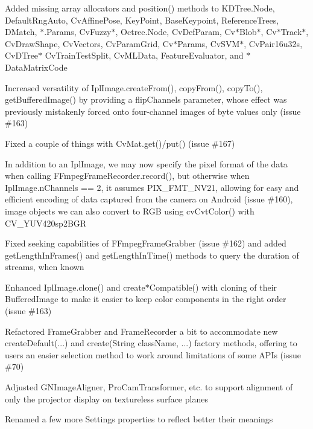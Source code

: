 \begin{DoxyItemize}
\item Added missing array allocators and {\ttfamily position()} methods to {\ttfamily K\+D\+Tree.\+Node}, {\ttfamily Default\+Rng\+Auto}, {\ttfamily Cv\+Affine\+Pose}, {\ttfamily Key\+Point}, {\ttfamily Base\+Keypoint}, {\ttfamily Reference\+Trees}, {\ttfamily D\+Match}, {\ttfamily $\ast$.Params}, {\ttfamily Cv\+Fuzzy$\ast$}, {\ttfamily Octree.\+Node}, {\ttfamily Cv\+Def\+Param}, {\ttfamily Cv$\ast$\+Blob$\ast$}, {\ttfamily Cv$\ast$\+Track$\ast$}, {\ttfamily Cv\+Draw\+Shape}, {\ttfamily Cv\+Vectors}, {\ttfamily Cv\+Param\+Grid}, {\ttfamily Cv$\ast$\+Params}, {\ttfamily Cv\+S\+V\+M$\ast$}, {\ttfamily Cv\+Pair16u32s}, {\ttfamily Cv\+D\+Tree$\ast$} {\ttfamily Cv\+Train\+Test\+Split}, {\ttfamily Cv\+M\+L\+Data}, {\ttfamily Feature\+Evaluator}, and {\ttfamily $\ast$\+Data\+Matrix\+Code}
\item Increased versatility of {\ttfamily Ipl\+Image.\+create\+From()}, {\ttfamily copy\+From()}, {\ttfamily copy\+To()}, {\ttfamily get\+Buffered\+Image()} by providing a {\ttfamily flip\+Channels} parameter, whose effect was previously mistakenly forced onto four-\/channel images of byte values only (issue \#163)
\item Fixed a couple of things with {\ttfamily Cv\+Mat.\+get()/put()} (issue \#167)
\item In addition to an {\ttfamily Ipl\+Image}, we may now specify the pixel format of the data when calling {\ttfamily F\+Fmpeg\+Frame\+Recorder.\+record()}, but otherwise when {\ttfamily Ipl\+Image.\+n\+Channels == 2}, it assumes {\ttfamily P\+I\+X\+\_\+\+F\+M\+T\+\_\+\+N\+V21}, allowing for easy and efficient encoding of data captured from the camera on Android (issue \#160), image objects we can also convert to R\+G\+B using {\ttfamily cv\+Cvt\+Color()} with {\ttfamily C\+V\+\_\+\+Y\+U\+V420sp2\+B\+G\+R}
\item Fixed seeking capabilities of {\ttfamily F\+Fmpeg\+Frame\+Grabber} (issue \#162) and added {\ttfamily get\+Length\+In\+Frames()} and {\ttfamily get\+Length\+In\+Time()} methods to query the duration of streams, when known
\item Enhanced {\ttfamily Ipl\+Image.\+clone()} and {\ttfamily create$\ast$\+Compatible()} with cloning of their {\ttfamily Buffered\+Image} to make it easier to keep color components in the right order (issue \#163)
\item Refactored {\ttfamily Frame\+Grabber} and {\ttfamily Frame\+Recorder} a bit to accommodate new {\ttfamily create\+Default(...)} and {\ttfamily create(String class\+Name, ...)} factory methods, offering to users an easier selection method to work around limitations of some A\+P\+Is (issue \#70)
\item Adjusted {\ttfamily G\+N\+Image\+Aligner}, {\ttfamily Pro\+Cam\+Transformer}, etc. to support alignment of only the projector display on textureless surface planes
\item Renamed a few more {\ttfamily Settings} properties to reflect better their meanings
\end{DoxyItemize}

